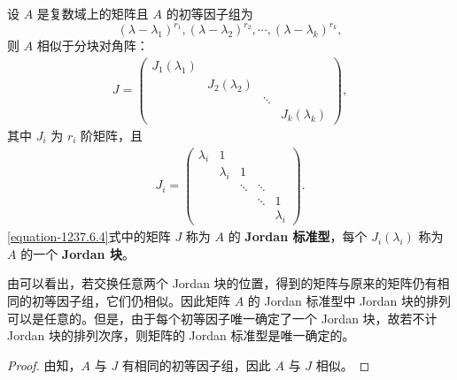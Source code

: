 \documentclass[../../main.tex]{subfiles}
\begin{document}
\begin{theorem}[Jordan标准型]\label{theorem:Jordan标准型}
设 $A$ 是复数域上的矩阵且 $A$ 的初等因子组为
\[
(\lambda - \lambda_1)^{r_1}, (\lambda - \lambda_2)^{r_2}, \cdots, (\lambda - \lambda_k)^{r_k},
\]
则 $A$ 相似于分块对角阵：
\begin{align}
J = \begin{pmatrix}
J_1(\lambda_1) & & & \\
& J_2(\lambda_2) & & \\
& & \ddots & \\
& & & J_k(\lambda_k)
\end{pmatrix},
\label{equation-1237.6.4}
\end{align}
其中 $J_i$ 为 $r_i$ 阶矩阵，且
\begin{align*}
J_i = \begin{pmatrix}
\lambda_i & 1 & & & \\
& \lambda_i & 1 & & \\
& & \ddots & \ddots & \\
& & & \ddots & 1 \\
& & & & \lambda_i
\end{pmatrix}.
\end{align*}
\eqref{equation-1237.6.4}式中的矩阵 $J$ 称为 $A$ 的\textbf{ Jordan 标准型}，每个 $J_i(\lambda_i)$ 称为 $A$ 的一个 \textbf{ Jordan 块}。 
\end{theorem}
\begin{remark}
由可以看出，若交换任意两个 Jordan 块的位置，得到的矩阵与原来的矩阵仍有相同的初等因子组，它们仍相似。因此矩阵 $A$ 的 Jordan 标准型中 Jordan 块的排列可以是任意的。但是，由于每个初等因子唯一确定了一个 Jordan 块，故若不计 Jordan 块的排列次序，则矩阵的 Jordan 标准型是唯一确定的。 
\end{remark}
\begin{proof}
由知，$A$ 与 $J$ 有相同的初等因子组，因此 $A$ 与 $J$ 相似。

\end{proof}
\end{document}
